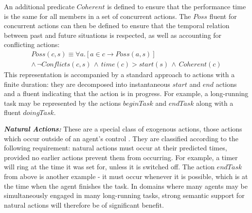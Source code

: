 An additional predicate $Coherent$ is defined to ensure that the
performance time is the same for all members in a set of concurrent
actions. The $Poss$ fluent for concurrent actions can then be defined
to ensure that the temporal relation between past and future situations
is respected, as well as accounting for conflicting actions:\begin{multline*}
Poss(c,s)\equiv\forall a.\left[a\in c\rightarrow Poss(a,s)\right]\\
\wedge\,\neg Conflicts(c,s)\,\wedge\, time(c)>start(s)\,\wedge\, Coherent(c)\end{multline*}
 This representation is accompanied by a standard approach to actions
with a finite duration: they are decomposed into instantaneous $start$
and $end$ actions and a fluent indicating that the action is in progress.
For example, a long-running task may be represented by the actions
$beginTask$ and $endTask$ along with a fluent $doingTask$.

\textbf{\emph{Natural Actions:}} These are a special class of exogenous
actions, those actions which occur outside of an agent's control \citep{reiter96sc_nat_conc}.
They are classified according to the following requirement: natural
actions must occur at their predicted times, provided no earlier actions
prevent them from occurring. For example, a timer will ring at the
time it was set for, unless it is switched off. The action $endTask$
from above is another example - it must occur whenever it is possible,
which is at the time when the agent finishes the task. In domains
where many agents may be simultaneously engaged in many long-running
tasks, strong semantic support for natural actions will therefore
be of significant benefit.

